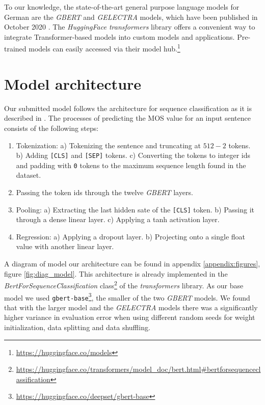 \documentclass[11pt, DIV12]{scrartcl}
\begin{document}
To our knowledge, the state-of-the-art general purpose language models for German are the \textit{GBERT} and \textit{GELECTRA} models, which have been published in October 2020 \cite{DBLP:journals/corr/abs-2010-10906}. The \textit{HuggingFace transformers} library \cite{DBLP:journals/corr/abs-1910-03771} offers a convenient way to integrate Transformer-based models into custom models and applications. Pre-trained models can easily accessed via their model hub.\footnote{\url{https://huggingface.co/models}}

\section{Model architecture}
\label{sec:model}

Our submitted model follows the architecture for sequence classification as it is described in \cite{DBLP:journals/corr/abs-1810-04805}. The processes of predicting the MOS value for an input sentence consists of the following steps:  

\begin{enumerate}
\setlength\itemsep{0pt}
\item Tokenization: a) Tokenizing the sentence and truncating at \(512-2\) tokens. \\ b) Adding \texttt{[CLS]} and \texttt{[SEP]} tokens. c) Converting the tokens to integer ids and padding with \texttt{0} tokens to the maximum sequence length found in the dataset. 
\item Passing the token ids through the twelve \textit{GBERT} layers.
\item Pooling: a) Extracting the last hidden sate of the \texttt{[CLS]} token. b) Passing it through a dense linear layer. c) Applying a tanh activation layer.
\item Regression: a) Applying a dropout layer. b) Projecting onto a single float value with another linear layer.
\end{enumerate}

A diagram of model our architecture can be found in appendix \ref{appendix:figures}, figure \ref{fig:diag_model}. This architecture is already implemented in the \textit{BertForSequenceClassification} class\footnote{\url{https://huggingface.co/transformers/model_doc/bert.html#bertforsequenceclassification}} of the \textit{transformers} library.
As our base model we used \texttt{gbert-base}\footnote{\url{https://huggingface.co/deepset/gbert-base}}, the smaller of the two \textit{GBERT} models. We found that with the larger model and the \textit{GELECTRA} models there was a significantly higher variance in evaluation error when using different random seeds for weight initialization, data splitting and data shuffling.
\end{document}
